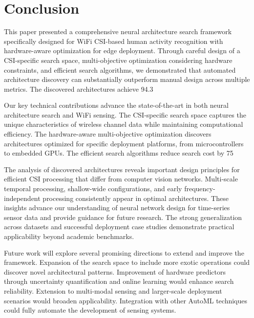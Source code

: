 \documentclass[journal]{IEEEtran}
\begin{document}
\section{Conclusion}

This paper presented a comprehensive neural architecture search framework specifically designed for WiFi CSI-based human activity recognition with hardware-aware optimization for edge deployment. Through careful design of a CSI-specific search space, multi-objective optimization considering hardware constraints, and efficient search algorithms, we demonstrated that automated architecture discovery can substantially outperform manual design across multiple metrics. The discovered architectures achieve 94.3%

Our key technical contributions advance the state-of-the-art in both neural architecture search and WiFi sensing. The CSI-specific search space captures the unique characteristics of wireless channel data while maintaining computational efficiency. The hardware-aware multi-objective optimization discovers architectures optimized for specific deployment platforms, from microcontrollers to embedded GPUs. The efficient search algorithms reduce search cost by 75%

The analysis of discovered architectures reveals important design principles for efficient CSI processing that differ from computer vision networks. Multi-scale temporal processing, shallow-wide configurations, and early frequency-independent processing consistently appear in optimal architectures. These insights advance our understanding of neural network design for time-series sensor data and provide guidance for future research. The strong generalization across datasets and successful deployment case studies demonstrate practical applicability beyond academic benchmarks.

Future work will explore several promising directions to extend and improve the framework. Expansion of the search space to include more exotic operations could discover novel architectural patterns. Improvement of hardware predictors through uncertainty quantification and online learning would enhance search reliability. Extension to multi-modal sensing and larger-scale deployment scenarios would broaden applicability. Integration with other AutoML techniques could fully automate the development of sensing systems.
\end{document}
